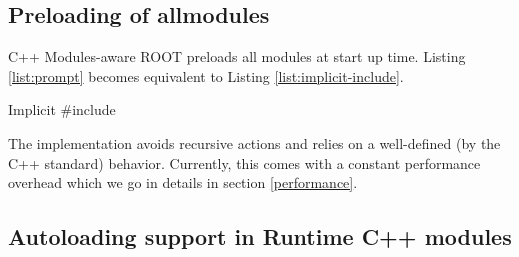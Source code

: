 \documentclass{webofc}
\begin{document}
\subsection{Preloading of allmodules}
\label{subsec:preloading}

C++ Modules-aware ROOT preloads all modules at start up time. Listing \ref{list:prompt} becomes equivalent to Listing \ref{list:implicit-include}.

\begin{listing}[h]
    \noindent
    \begin{minipage}[h]{.7\textwidth}
    \end{minipage}
    \caption{Implicit \#include}
    \label{list:implicit-include}
\end{listing}

The implementation avoids recursive actions and relies on a well-defined (by the C++ standard) behavior. Currently, this comes with a constant performance overhead which we go in details in section \ref{performance}.

\subsection{Autoloading support in Runtime C++ modules}
\label{subsec:autoloading}
\end{document}
